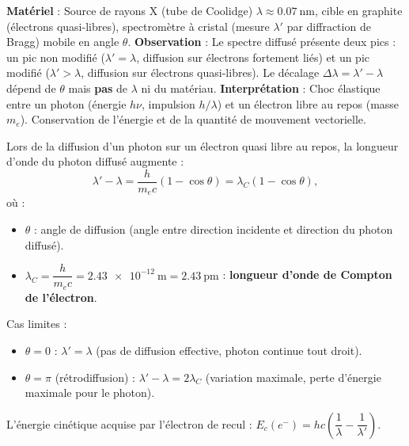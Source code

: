 \documentclass[11pt]{article}
\newcommand{\cle}[1]{{\popxbold\color{popdark}#1}}
\begin{document}
\begin{experience}
\textbf{Matériel} : Source de rayons X (tube de Coolidge) $\lambda \approx \num{0,07}\ \text{nm}$, cible en graphite (électrons quasi-libres), spectromètre à cristal (mesure $\lambda'$ par diffraction de Bragg) mobile en angle $\theta$.
\textbf{Observation} : Le spectre diffusé présente deux pics : un pic non modifié ($\lambda' = \lambda$, diffusion sur électrons fortement liés) et un pic modifié ($\lambda' > \lambda$, diffusion sur électrons quasi-libres). Le décalage $\Delta\lambda = \lambda' - \lambda$ dépend de $\theta$ mais \textbf{pas} de $\lambda$ ni du matériau.
\textbf{Interprétation} : Choc élastique entre un photon (énergie $h\nu$, impulsion $h/\lambda$) et un électron libre au repos (masse $m_e$). Conservation de l'énergie et de la quantité de mouvement vectorielle.
\end{experience}

\begin{propriete}
Lors de la diffusion d'un photon sur un électron quasi libre au repos, la longueur d'onde du photon diffusé augmente :
\[ \lambda' - \lambda = \frac{h}{m_e c}(1 - \cos\theta) = \lambda_C (1 - \cos\theta), \]
où :
\begin{itemize}
\item $\theta$ : angle de diffusion (angle entre direction incidente et direction du photon diffusé).
\item $\lambda_C = \dfrac{h}{m_e c} = \num{2,43e-12}\ \text{m} = \num{2,43}\ \text{pm}$ : \textbf{longueur d'onde de Compton de l'électron}.
\end{itemize}
\cle{Cas limites} :
\begin{itemize}
\item $\theta = 0$ : $\lambda' = \lambda$ (pas de diffusion effective, photon continue tout droit).
\item $\theta = \pi$ (rétrodiffusion) : $\lambda' - \lambda = 2\lambda_C$ (variation maximale, perte d'énergie maximale pour le photon).
\end{itemize}
L'énergie cinétique acquise par l'électron de recul : $E_c(e^-) = hc\left(\dfrac{1}{\lambda} - \dfrac{1}{\lambda'}\right)$.
\end{propriete}
\end{document}
